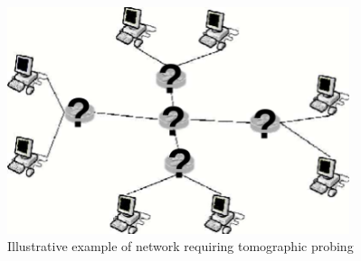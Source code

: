\begin{figure}
    \centering
    \includegraphics[width=10cm]{figs/intro/nettom-illustration.png}
    \caption[Illustrative example of network requiring tomographic probing]{Illustrative example of network requiring tomographic probing \cite{lawrence_network_2006}}
    \label{fig:nettom?}
\end{figure}

